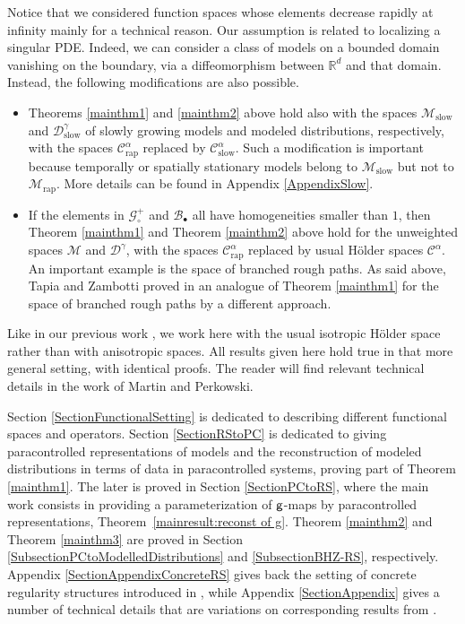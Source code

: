 \documentclass[JEP,XML,SOM,Unicode,published]{cedram}
\newcommand{\sbullet}{{\scriptscriptstyle\bullet}}
\theoremstyle{plain}
\theoremstyle{definition}
\newcommand{\rap}{\mathrm{rap}}
\newcommand{\slow}{\mathrm{slow}}
\newcommand{\scrM}{\mathscr{M}}
\newcommand{\mcB}{\mathcal{B}}
\newcommand{\mcC}{\mathcal{C}}
\newcommand{\mcD}{\mathcal{D}}
\newcommand{\mcG}{\mathcal{G}}
\begin{document}
Notice that we considered function spaces whose elements decrease rapidly at infinity mainly for a technical reason. Our assumption is related to localizing a singular PDE. Indeed, we can consider a class of models on a bounded domain vanishing on the boundary, via a diffeomorphism between $\mathbb{R}^d$ and that domain. Instead, the following modifications are also possible.
\begin{itemize}
\item Theorems \ref{mainthm1} and \ref{mainthm2} above hold also with the spaces $\scrM_{\slow}$ and $\mcD_{\slow}^\gamma$ of slowly growing models and modeled distributions, respectively, with the spaces $\mcC_{\rap}^\alpha$ replaced by $\mcC_{\slow}^\alpha$. Such a modification is important because temporally or spatially stationary models belong to $\scrM_{\slow}$ but not to $\scrM_{\rap}$. More details can be found in Appendix \ref{AppendixSlow}.

\item If the elements in $\mcG_\circ^+$ and $\mcB_\sbullet$ all have homogeneities smaller than $1$, then Theorem \ref{mainthm1} and Theorem \ref{mainthm2} above hold for the unweighted spaces $\scrM$ and $\mcD^\gamma$, with the spaces $\mcC_{\rap}^\alpha$ replaced by usual Hölder spaces $\mcC^\alpha$. An important example is the space of branched rough paths. As said above, Tapia and Zambotti proved in \cite{TZ18} an analogue of Theorem \ref{mainthm1} for the space of branched rough paths by a different approach.
\end{itemize}

Like in our previous work \cite{BH}, we work here with the usual isotropic Hölder space rather than with anisotropic spaces. All results given here hold true in that more general setting, with identical proofs. The reader will find relevant technical details in the work \cite{MP18} of Martin and Perkowski.\enlargethispage{.5\baselineskip}%

Section \ref{SectionFunctionalSetting} is dedicated to describing different functional spaces and operators. Section \ref{SectionRStoPC} is dedicated to giving paracontrolled representations of models and the recons\-truction of modeled distributions in terms of data in paracontrolled systems, proving part of Theorem \ref{mainthm1}. The later is proved in Section \ref{SectionPCtoRS}, where the main work consists in providing a parameterization of $\sf g$-maps by paracontrolled representations, Theorem~\ref{mainresult:reconst of g}. Theorem \ref{mainthm2} and Theorem \ref{mainthm3} are proved in Section \ref{SubsectionPCtoModelledDistributions} and \ref{SubsectionBHZ-RS}, respectively. Appendix \ref{SectionAppendixConcreteRS} gives back the setting of concrete regularity structures introduced in \cite{BH}, while Appendix \ref{SectionAppendix} gives a number of technical details that are variations on corresponding results from \cite{BH}.
\end{document}
